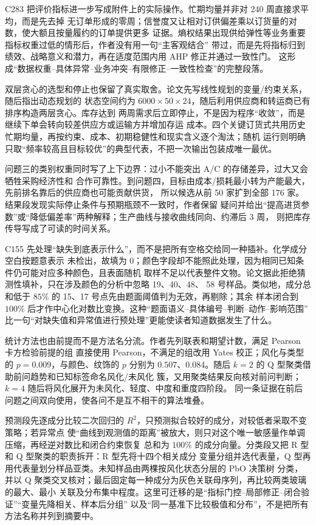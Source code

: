 \documentclass[UTF8,a4paper,12pt]{ctexart}
\begin{document}
C283 把评价指标进一步写成附件上的实际操作。忙期均量并非对 240 周直接求平均，而是先去掉
无订单形成的零周；信誉度又让相对订供偏差乘以订货量的对数，使大额且按量履约的订单提供更多
证据。熵权结果出现供给弹性等业务重要指标权重过低的情形后，作者没有用一句“主客观结合”
带过，而是先将指标归到绩效、战略意义和潜力，再在适度范围内用 AHP 修正并通过一致性门。
这形成“数据权重--具体异常--业务冲突--有限修正--一致性检查”的完整段落。

双层贪心的选型和停止也保留了真实取舍。论文先写线性规划的变量/约束关系，随后指出动态规划的
状态空间约为 $6000\times50\times24$，随后利用供应商和转运商已有排序构造两层贪心。库存达到
两周需求后立即停止，不是因为程序“收敛”，而是继续下单会转向较差供应方或运输方并增加存运
成本。四个关键订货式共用历史忙期均量，再按约束、成本、初期稳健性和现实含义逐个淘汰；随机
运行则明确只取“频率较高且目标较优”的典型代表，不把一次输出包装成唯一最优。

问题三的类别权重同时写了上下边界：过小不能突出 A/C 的存储差异，过大又会牺牲采购经济性和
合作可靠性。到问题四，目标由成本/损耗最小转为产能最大，先前排名靠后的供应商也可能贡献供货，
所以候选从前 50 家扩到全部 176 家。结果段发现实际停止条件与预期瓶颈不一致时，作者保留
疑问并给出“提高进货参数”或“降低偏差率”两种解释；生产曲线与接收曲线同向、约滞后 3 周，
则把库存传导写成了可读的时间关系。

C155 先处理“缺失到底表示什么”，而不是把所有空格交给同一种插补。化学成分空白按题意表示
未检出，故填为 0；颜色字段却不能照此处理，因为相同已知条件仍可能对应多种颜色，且表面随机
取样不足以代表整件文物。论文据此拒绝猜测性填补，只在涉及颜色的分析中忽略 19、40、48、
58 号样品。类似地，成分总和低于 $85\%$ 的 15、17 号点先由题面阈值判为无效，再剔除；其余
样本闭合到 $100\%$ 后才作中心化对数比变换。这种“题面语义--具体编号--判断--动作--影响范围”
比一句“对缺失值和异常值进行预处理”更能使读者知道数据发生了什么。

统计方法也由前提而不是方法名分流。作者先列联表和期望计数，满足 Pearson 卡方检验前提的组
直接使用 Pearson，不满足的组改用 Yates 校正；风化与类型的 $p=0.009$，与颜色、纹饰的
$p$ 分别为 $0.507$、$0.084$。随后 $k=2$ 的 Q 型聚类借助前问趋势和已知标签命名风化/未风化
簇，又用聚类结果反向核对前问判断；$k=4$ 随后将风化展开为未风化、轻度、中度和重度四阶段。
同一条证据在前后问题之间双向使用，使各问不是互不相干的算法堆叠。

预测段先逐成分比较二次回归的 $R^2$，只预测拟合较好的成分，对较低者采取不变策略；若异常点
使“曲线到观测值的距离”被放大，则只对这个唯一敏感量作单调压缩，再经逆对数比和闭合约束恢复
总和为 $100\%$ 的成分向量。分类段又把 R 型和 Q 型聚类的职责拆开：R 型先将十四个相关成分
变量分组并选代表量，Q 型再用代表量划分样品亚类。未知样品由两棵按风化状态分层的 PbO 决策树
分类，并以 Q 聚类交叉核对；最后固定每一种成分为灰色关联母序列，再比较两类玻璃的最大、最小
关联及分布集中程度。这里可迁移的是“指标门控--局部修正--闭合验证”“变量先降相关、样本后分组”
以及“同一基准下比较极值和分布”，不是把所有方法名称并列到摘要中。
\end{document}
